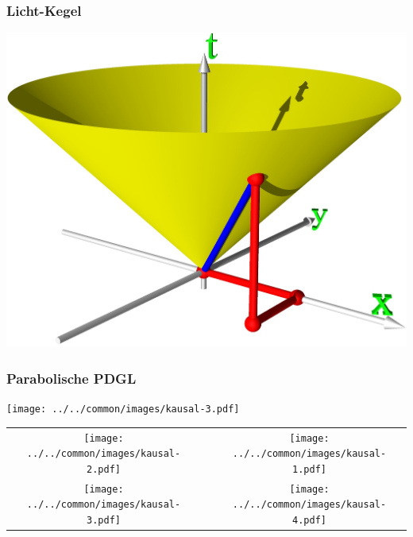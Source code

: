 \begin{frame}
\frametitle{Licht-Kegel}
\begin{center}
\includegraphics[width=\hsize]{lichtkegel.jpg}
\end{center}
\end{frame}

\begin{frame}
\frametitle{Parabolische PDGL}
\begin{center}
\texttt{[image: ../../common/images/kausal-3.pdf]}
\end{center}
\end{frame}

\begin{frame}
\begin{center}
\begin{tabular}{ccc}
\texttt{[image: ../../common/images/kausal-2.pdf]}&&
\texttt{[image: ../../common/images/kausal-1.pdf]}\\
\texttt{[image: ../../common/images/kausal-3.pdf]}&&
\texttt{[image: ../../common/images/kausal-4.pdf]}
\end{tabular}
\end{center}
\end{frame}
